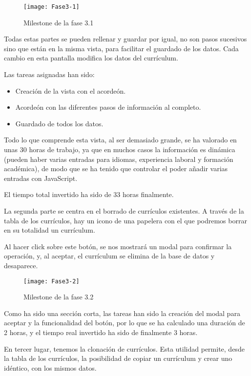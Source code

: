 \begin{figure}
    \centering
    \texttt{[image: Fase3-1]}
    \caption{Milestone de la fase 3.1}
\end{figure}

Todas estas partes se pueden rellenar y guardar por igual, no son pasos sucesivos sino que están 
en la misma vista, para facilitar el guardado de los datos. Cada cambio en esta pantalla modifica
los datos del currículum.

Las tareas asignadas han sido:
\begin{itemize}
\tightlist
\item Creación de la vista con el acordeón.
\item Acordeón con las diferentes pasos de información al completo.
\item Guardado de todos los datos.
\end{itemize}

Todo lo que comprende esta vista, al ser demasiado grande, se ha valorado en unas 30 horas 
de trabajo, ya que en muchos casos la información es dinámica (pueden haber varias entradas
para idiomas, experiencia laboral y formación académica), de modo que se ha tenido que 
controlar el poder añadir varias entradas con JavaScript.

El tiempo total invertido ha sido de 33 horas finalmente.

La segunda parte se centra en el borrado de currículos existentes. A través de la tabla de
los currículos, hay un icono de una papelera con el que podremos borrar en su totalidad un
currículum.

Al hacer click sobre este botón, se nos mostrará un modal para confirmar la operación, y, al aceptar, el currículum se elimina de la base de datos y desaparece.

\begin{figure}
    \centering
    \texttt{[image: Fase3-2]}
    \caption{Milestone de la fase 3.2}
\end{figure}

Como ha sido una sección corta, las tareas han sido la creación del modal para aceptar y la
funcionalidad del botón, por lo que se ha calculado una duración de 2 horas, y el tiempo real
invertido ha sido de finalmente 3 horas.

En tercer lugar, tenemos la clonación de currículos. Esta utilidad permite, desde la tabla
de los currículos, la posibilidad de copiar un currículum y crear uno idéntico, con los mismos 
datos. 

